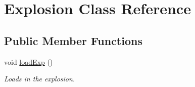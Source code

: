 \hypertarget{classExplosion}{\section{Explosion Class Reference}
\label{classExplosion}
}
\subsection*{Public Member Functions}
\begin{DoxyCompactItemize}
\item 
\hypertarget{classExplosion_a2a80a53651076744404ae41d73f3a6d8}{void \hyperlink{classExplosion_a2a80a53651076744404ae41d73f3a6d8}{load\-Exp} ()}\label{classExplosion_a2a80a53651076744404ae41d73f3a6d8}

\begin{DoxyCompactList}\small\item\em Loads in the explosion. \end{DoxyCompactList}\end{DoxyCompactItemize}
